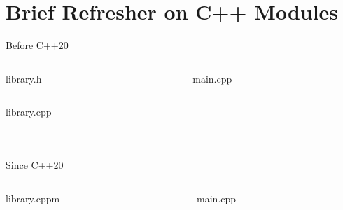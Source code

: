 \documentclass[]{beamer}
\begin{document}
\section{Brief Refresher on C++ Modules}
\begin{frame}[containsverbatim]{Before C++20}
  \begin{columns}
    \begin{column}{0.5\textwidth}
      \begin{block}{library.h}
        \inputminted{cpp}{snippets/cpp17/library.h}
      \end{block}
      \begin{block}{library.cpp}
        \inputminted{cpp}{snippets/cpp17/library.cpp}
      \end{block}
    \end{column}
    \begin{column}{0.5\textwidth}
      \begin{block}{main.cpp}
        \inputminted{cpp}{snippets/cpp17/main.cpp}
      \end{block}
    \end{column}
  \end{columns}
  \begin{block}{}
    \inputminted{bash}{snippets/cpp17/build.sh}
  \end{block}

\end{frame}


\begin{frame}[containsverbatim]{Since C++20}
  \begin{columns}
    \begin{column}{0.5\textwidth}
      \begin{block}{library.cppm}
        \inputminted{cpp}{snippets/cpp20/library.cppm}
      \end{block}
    \end{column}
    \begin{column}{0.5\textwidth}
      \begin{block}{main.cpp}
        \inputminted{cpp}{snippets/cpp20/main.cpp}
      \end{block}
    \end{column}
  \end{columns}
  \begin{block}{}
    \inputminted{bash}{snippets/cpp20/build.sh}
  \end{block}

\end{frame}
\end{document}
